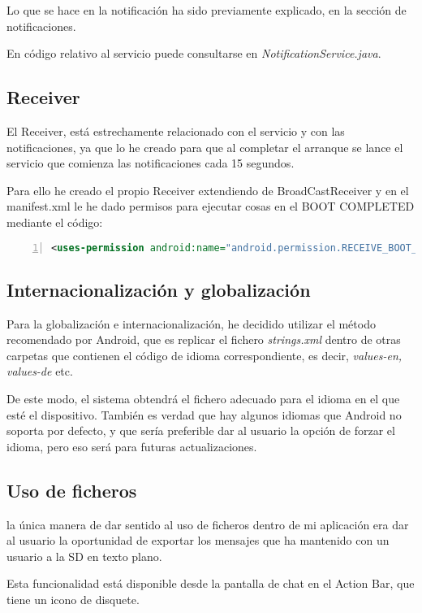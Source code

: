 \documentclass{article}
\begin{document}
Lo que se hace en la notificaci\'on ha sido previamente explicado, en la secci\'on de 
notificaciones.

En c\'odigo relativo al servicio puede consultarse en \emph{NotificationService.java}.

\subsection{Receiver}
El Receiver, est\'a estrechamente relacionado con el servicio y con las notificaciones,
ya que lo he creado para que al completar el arranque se lance el servicio que comienza las
notificaciones cada 15 segundos.

Para ello he creado el propio Receiver extendiendo de BroadCastReceiver y en el manifest.xml
le he dado permisos para ejecutar cosas en el BOOT COMPLETED mediante el c\'odigo:

\begin{lstlisting}[language=XML, numbers=left]
<uses-permission android:name="android.permission.RECEIVE_BOOT_COMPLETED" />
\end{lstlisting}

\subsection{Internacionalizaci\'on y globalizaci\'on}
Para la globalizaci\'on e internacionalizaci\'on, he decidido utilizar el m\'etodo
recomendado por Android, que es replicar el fichero \emph{strings.xml} dentro de otras
carpetas que contienen el c\'odigo de idioma correspondiente, es decir, 
\emph{values-en, values-de} etc.

De este modo, el sistema obtendr\'a el fichero adecuado para el idioma en el que est\'e el
dispositivo. Tambi\'en es verdad que hay algunos idiomas que Android no soporta por defecto, y
que ser\'ia preferible dar al usuario la opci\'on de forzar el idioma, pero eso ser\'a para
futuras actualizaciones.

\subsection{Uso de ficheros}
la \'unica manera de dar sentido al uso de ficheros dentro de mi aplicaci\'on era dar
al usuario la oportunidad de exportar los mensajes que ha mantenido con un usuario a la SD
en texto plano.

Esta funcionalidad est\'a disponible desde la pantalla de chat en el Action Bar, que tiene
un icono de disquete.
\end{document}
